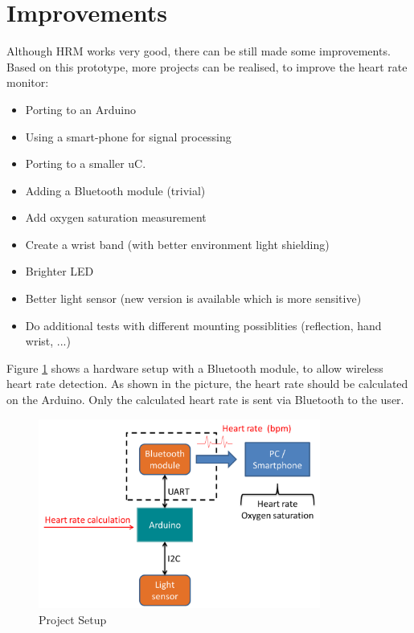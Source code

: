 \documentclass[notitlepage]{scrreprt}
\begin{document}
\section{Improvements}
Although HRM works very good, there can be still made some improvements. Based on this prototype, more projects can be realised, to improve the heart rate monitor:

\begin{itemize}
	\item{Porting to an Arduino}
	\item{Using a smart-phone for signal processing}
	\item{Porting to a smaller uC.}
	\item{Adding a Bluetooth module (trivial)}
	\item{Add oxygen saturation measurement}
	\item{Create a wrist band (with better environment light shielding)}
	\item{Brighter LED}
	\item{Better light sensor (new version is available which is more sensitive)}
	\item{Do additional tests with different mounting possiblities (reflection, hand wrist, ...)}
\end{itemize}

Figure \ref{fig:data-flow1} shows a hardware setup with a Bluetooth module, to allow wireless heart rate detection. As shown in the picture, the heart rate should be calculated on the Arduino. Only the calculated heart rate is sent via Bluetooth to the user.

\begin{figure}[H]
	\centering
	\includegraphics[width=350px]{images/general_dataFlow_first.png}
	\caption{Project Setup}
	\label{fig:data-flow1}
\end{figure}
\end{document}
